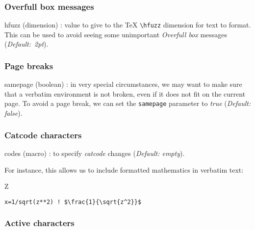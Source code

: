 \documentclass[twoside]{article}
\newcommand\cs[1]{\texttt{\textbackslash#1}}
\providecommand\optname[1]{\textsf{#1}}
\newenvironment{optlist}{\begin{description}%
  \renewcommand\makelabel[1]{%
    \descriptionlabel{\mdseries\optname{##1}}}%
  \itemsep0.25\itemsep}%
 {\end{description}}
\begin{document}
\subsubsection{Overfull box messages}

\begin{optlist}
  \item[hfuzz (dimension)]: value to give to the \TeX{} \cs{hfuzz} dimension
  for text to format. This can be used to avoid seeing some unimportant
  \emph{Overfull box} messages (\emph{Default:~2pt}).
\end{optlist}

\subsubsection{Page breaks}

\begin{optlist}
  \item[samepage (boolean)]: in very special circumstances, we may want to
  make sure that a verbatim environment is not broken, even if it does not
  fit on the current page. To avoid a page break, we can set the
  \texttt{samepage} parameter to \emph{true} (\emph{Default: false}).
\end{optlist}

\subsubsection{Catcode characters}

\begin{optlist}
  \item[codes (macro)]: to specify \emph{catcode} changes (\emph{Default:
  empty}).
\end{optlist}

  For instance, this allows us to include formatted mathematics in verbatim
text:

{
\begin{SideBySideExample}
  Z
  \begin{Verbatim}[commandchars=\\\{\},
         codes={\catcode`$=3\catcode`^=7}]
    x=1/sqrt(z**2) ! $\frac{1}{\sqrt{z^2}}$
  \end{Verbatim}
\end{SideBySideExample}
}  %


\subsubsection{Active characters}
\end{document}
